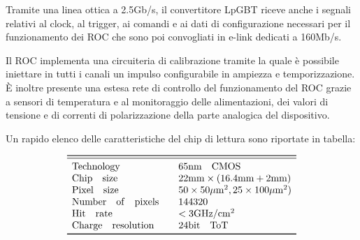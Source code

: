 Tramite una linea ottica a 2.5Gb/s, il convertitore LpGBT riceve anche i segnali relativi al clock, al trigger, ai comandi e ai dati di configurazione necessari per il funzionamento dei ROC che sono poi convogliati in e-link dedicati a 160Mb/s. 

Il ROC implementa una circuiteria di calibrazione tramite la quale \`e possibile iniettare in tutti i canali un impulso configurabile in ampiezza e temporizzazione. \`E inoltre presente una estesa rete di controllo del funzionamento del ROC grazie a sensori di temperatura e al monitoraggio delle alimentazioni, dei valori di tensione e di correnti di polarizzazione della parte analogica del dispositivo.

%
%

Un rapido elenco delle caratteristiche del chip di lettura sono riportate in tabella:

\[
\begin{array}{ll}

\toprule

\midrule

\mathrm{Technology} & \quad 65 \mathrm{nm \quad CMOS}\\

\mathrm{Chip \quad size} & \quad \mathrm{22 mm \times (16.4 mm + 2 mm)} \\

\mathrm{Pixel \quad size} & \quad \mathrm{50 \times 50 \mu m^2, 25 \times 100 \mu m^2)} \\

\mathrm{Number\quad of\quad pixels} & \quad \mathrm{144320} \\

\mathrm{Hit \quad rate} & \quad \mathrm{< 3 GHz/cm^2} \\

\mathrm{Charge \quad resolution} & \quad \mathrm{24 bit \quad ToT} \\


\bottomrule
\end{array}
\]


